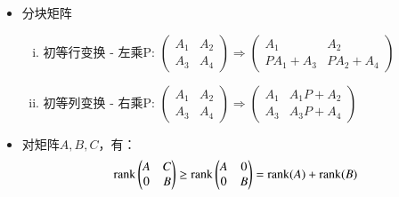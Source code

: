 \documentclass[UTF8,9pt]{ctexart}
\begin{document}
\begin{itemize}
	\item 分块矩阵\\
		\begin{enumerate}[(i)]
			\item 初等行变换 - 左乘P:
				$\left(\begin{smallmatrix}
					A_1 & A_2\\
					A_3 & A_4
				\end{smallmatrix}\right)
				\Longrightarrow
				\left(\begin{smallmatrix}
					A_1      &      A_2\\
					PA_1+A_3 & PA_2+A_4
				\end{smallmatrix}\right)$\\
			\item 初等列变换 - 右乘P:
				$\left(\begin{smallmatrix}
					A_1  &  A_2\\
					A_3  &  A_4
				\end{smallmatrix}\right)
				\Longrightarrow
				\left(\begin{smallmatrix}
					A_1 & A_1P+A_2\\
					A_3 & A_3P+A_4
				\end{smallmatrix}\right)$
		\end{enumerate}
	\item 对矩阵$A,B,C$，有：
		$$\mathrm{rank}\begin{pmatrix}
				A & C \\
				0 & B
		\end{pmatrix}
		\geq
		\mathrm{rank}\begin{pmatrix}
			A & 0 \\
			0 & B
		\end{pmatrix}
		=\mathrm{rank}(A)+\mathrm{rank}(B)$$
\end{itemize}
\end{document}
